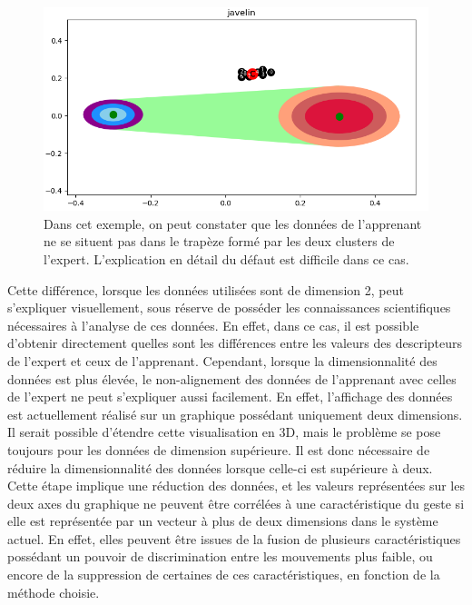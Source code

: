 \begin{figure}[h]
    \centering
    \includegraphics[width=\textwidth]{pictures/non_aligned_default.png}
    \caption[Un exemple de non-alignement des données de l'apprenant par rapport à celles de l'expert]{Dans cet exemple, on peut constater que les données de l'apprenant ne se situent pas dans le trapèze formé par les deux clusters de l'expert. L'explication en détail du défaut est difficile dans ce cas.}
    \label{fig:non_aligned_default}
\end{figure}

Cette différence, lorsque les données utilisées sont de dimension 2, peut s'expliquer visuellement, sous réserve de posséder les connaissances scientifiques nécessaires à l'analyse de ces données. En effet, dans ce cas, il est possible d'obtenir directement quelles sont les différences entre les valeurs des descripteurs de l'expert et ceux de l'apprenant. Cependant, lorsque la dimensionnalité des données est plus élevée, le non-alignement des données de l'apprenant avec celles de l'expert ne peut s'expliquer aussi facilement. En effet, l'affichage des données est actuellement réalisé sur un graphique possédant uniquement deux dimensions. Il serait possible d'étendre cette visualisation en 3D, mais le problème se pose toujours pour les données de dimension supérieure. Il est donc nécessaire de réduire la dimensionnalité des données lorsque celle-ci est supérieure à deux. Cette étape implique une réduction des données, et les valeurs représentées sur les deux axes du graphique ne peuvent être corrélées à une caractéristique du geste si elle est représentée par un vecteur à plus de deux dimensions dans le système actuel. En effet, elles peuvent être issues de la fusion de plusieurs caractéristiques possédant un pouvoir de discrimination entre les mouvements plus faible, ou encore de la suppression de certaines de ces caractéristiques, en fonction de la méthode choisie.

